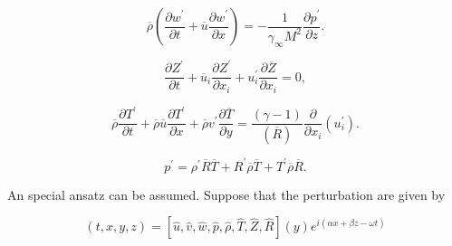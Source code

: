 \begin{equation} 
\overline{\rho}
\left(
\frac{\partial w^{\prime}}{\partial t}
+
\overline{u}
\frac{\partial w^{\prime}}{\partial x}
\right)
=
-
\frac{1}{\gamma_{\infty} M^{2}}
\frac{\partial p^{\prime} }{\partial z} 
.
\end{equation} 

\begin{equation} 
\frac{\partial Z^{\prime}}{\partial t}
+
\overline{u}_i 
\frac{\partial  Z^{\prime}}{\partial x_i}
+
u_i^{\prime} 
\frac{\partial \overline{Z}}{\partial x_i}
=
0
,
\end{equation} 

\begin{equation}
\overline{\rho}
\frac{\partial T^{\prime} }{\partial  t}
+
\overline{\rho}
\overline{u}
\frac{\partial T^{\prime}}{\partial x}
+
\overline{\rho}
v^{\prime}
\frac{\partial \overline{T} }{\partial y} 
= 
\frac{(\gamma-1)}{(\overline{R})}
\frac{\partial}{\partial x_i} 
(u^\prime_i) 
.
\end{equation} 

\begin{equation*}
   p^{\prime}
   = 
   \rho^{\prime}
   \overline{R}
   \overline{T}
   +
   R^{\prime}
   \overline{\rho}
   \overline{T}
   +
   T^{\prime}
   \overline{\rho}
   \overline{R}
   .
\end{equation*}

An special ansatz can be assumed. Suppose that 
the perturbation are given  by 

\begin{equation}
   [u^\prime, v^\prime, w^\prime, p^\prime, \rho^\prime, T^\prime,  Z^\prime, R^\prime] 
   (t,x,y,z)
   =
   [\hat{u}, \hat{v}, \hat{w},\hat{p},\hat{\rho},\hat{T},\hat{Z},\hat{R}]
   (y)
   e^{i(\alpha x+\beta z  -\omega t)}
   \label{ansatz}
\end{equation}

%

